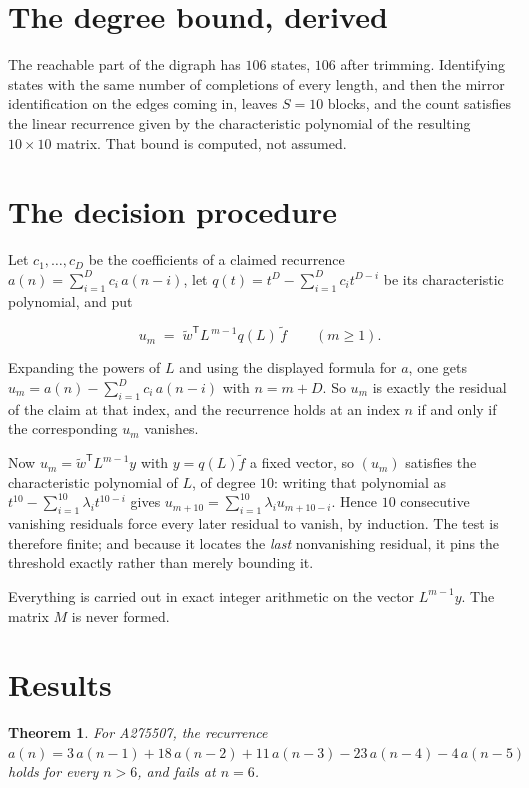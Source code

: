 \documentclass[11pt]{article}
\newtheorem{theorem}{Theorem}
\theoremstyle{definition}
\begin{document}
\section{The degree bound, derived}

The reachable part of the digraph has $106$ states, $106$ after trimming. Identifying states with the same number of completions of every length, and then the mirror identification on the edges coming in, leaves $S = 10$ blocks, and the count satisfies the linear recurrence given by the characteristic polynomial of the resulting $10\times10$ matrix. That bound is computed, not assumed.

\section{The decision procedure}

Let $c_1,\dots,c_D$ be the coefficients of a claimed recurrence $a(n) = \sum_{i=1}^{D} c_i\,a(n-i)$, let $q(t) = t^{D} - \sum_{i=1}^{D} c_i t^{D-i}$ be its characteristic polynomial, and put

\[u_m \;=\; \tilde w^{\mathsf T} L^{\,m-1} q(L)\,\tilde f \qquad (m \ge 1).\]

Expanding the powers of $L$ and using the displayed formula for $a$, one gets $u_m = a(n) - \sum_{i=1}^{D} c_i\,a(n-i)$ with $n = m + D$. So $u_m$ is exactly the residual of the claim at that index, and the recurrence holds at an index $n$ if and only if the corresponding $u_m$ vanishes.

Now $u_m = \tilde w^{\mathsf T} L^{m-1} y$ with $y = q(L)\tilde f$ a fixed vector, so $(u_m)$ satisfies the characteristic polynomial of $L$, of degree $10$: writing that polynomial as $t^{10} - \sum_{i=1}^{10} \lambda_i t^{10-i}$ gives $u_{m+10} = \sum_{i=1}^{10} \lambda_i u_{m+10-i}$. Hence $10$ consecutive vanishing residuals force every later residual to vanish, by induction. The test is therefore finite; and because it locates the {\itshape last} nonvanishing residual, it pins the threshold exactly rather than merely bounding it.

Everything is carried out in exact integer arithmetic on the vector $L^{m-1}y$. The matrix $M$ is never formed.

\section{Results}

\begin{theorem} For A275507, the recurrence $a(n) = 3\,a(n-1) + 18\,a(n-2) + 11\,a(n-3) - 23\,a(n-4) - 4\,a(n-5)$ holds for every $n > 6$, and fails at $n = 6$.\end{theorem}
\end{document}
